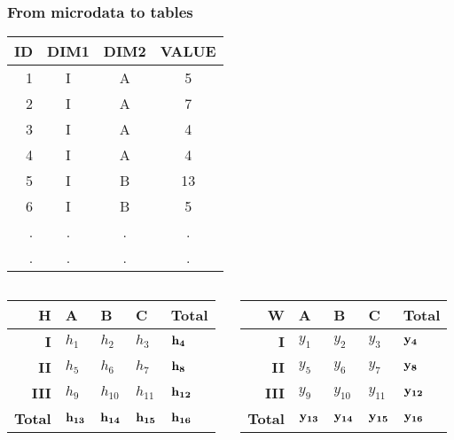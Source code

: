 \begin{frame}\frametitle{From microdata to tables}
	\vspace{-0.2cm}
	\begin{center}
	\begin{tabular}{|r|ccc|}
	\hline
	{\bf ID} & {\bf DIM1} & {\bf DIM2} & {\bf VALUE}  \\ \hline
	1 & I & A & 5 \\ 
	2 & I & A & 7 \\ 
	3 & I & A & 4 \\	
	4 & I & A & 4 \\
	5 & I & B & 13 \\ 
	6 & I & B & 5 \\ 	
	. & . & . & . \\ 	
	. & . & . & . \\ 			
	\hline
	\end{tabular}
	\end{center}
	
	\vspace{-1cm}
	
	\begin{columns}
	\begin{column}{5cm}
		\begin{center}
			\begin{tabular}{|r|lll|l|}
			\hline
			{\bf H} & {\bf A} & {\bf B} & {\bf C} & {\bf Total} \\ 
			\hline
			{\bf I} & $h_1$ & $h_2$ & $h_3$ & $\mathbf{h_4}$ \\ 
			{\bf II} & $h_5$ & $h_6$ & $h_7$ & $\mathbf{h_8}$ \\ 
			{\bf III} & $h_9$ & $h_{10}$ & $h_{11}$ & $\mathbf{h_{12}}$ \\ 
			\hline
			{\bf Total} & $\mathbf{h_{13}}$ & $\mathbf{h_{14}}$ & $\mathbf{h_{15}}$ & $\mathbf{h_{16}}$ \\
			\hline
			\end{tabular}
		\end{center}		
	\end{column}
	\begin{column}{5cm}
		\begin{center}
			\begin{tabular}{|r|lll|l|}
			\hline
			{\bf W} & {\bf A} & {\bf B} & {\bf C} & {\bf Total} \\ 
			\hline
			{\bf I} & $y_1$ & $y_2$ & $y_3$ & $\mathbf{y_4}$ \\ 
			{\bf II} & $y_5$ & $y_6$ & $y_7$ & $\mathbf{y_8}$ \\ 
			{\bf III} & $y_9$ & $y_{10}$ & $y_{11}$ & $\mathbf{y_{12}}$ \\ 
			\hline
			{\bf Total} & $\mathbf{y_{13}}$ & $\mathbf{y_{14}}$ & $\mathbf{y_{15}}$ & $\mathbf{y_{16}}$ \\
			\hline
			\end{tabular}
		\end{center}			
		\end{column}
	\end{columns}
\end{frame}

